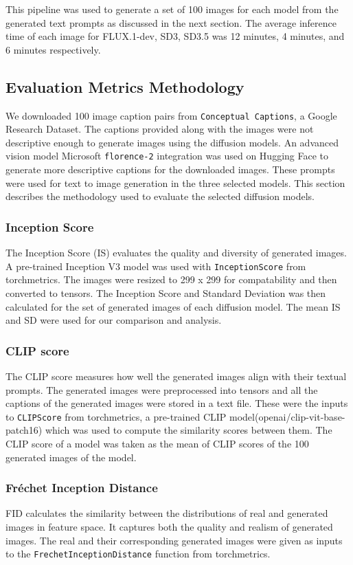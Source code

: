 \documentclass{article}
\begin{document}
This pipeline was used to generate a set of 100 images for each model from the generated text prompts as discussed in the next section. The average inference time of each image for FLUX.1-dev, SD3, SD3.5 was 12 minutes, 4 minutes, and 6 minutes respectively.

\subsection{Evaluation Metrics Methodology}
We downloaded 100 image caption pairs from \texttt{Conceptual Captions}, a Google Research Dataset. 
The captions provided along with the images were not descriptive enough to generate images 
using the diffusion models. An advanced vision model Microsoft \texttt{florence-2} integration was used on Hugging Face 
to generate more descriptive captions for the downloaded images. These prompts were used for text to image generation 
in the three selected models. This section describes the methodology used to evaluate the selected diffusion models. 

\subsubsection{Inception Score}
The Inception Score (IS) evaluates the quality and diversity of generated images. A pre-trained Inception V3 model was used with 
\texttt{InceptionScore} from torchmetrics. The images were resized to 299 x 299 for compatability and then converted to tensors. The Inception Score
and Standard Deviation was then calculated for the set of generated images of each diffusion model. The mean IS and SD were used for our comparison and analysis.

\subsubsection{CLIP score}
The CLIP score measures how well the generated images align with their textual prompts. The generated images were 
preprocessed into tensors and all the captions of the generated images were stored in a text file. These were the inputs to \texttt{CLIPScore} from 
torchmetrics, a pre-trained CLIP model(openai/clip-vit-base-patch16) which was 
used to compute the similarity scores between them. The CLIP score of a model was taken as the mean of CLIP scores 
of the 100 generated images of the model. 

\subsubsection{Fréchet Inception Distance}
FID calculates the similarity between the distributions of real and generated images 
in feature space. It captures both the quality and realism of generated images. The real and their corresponding generated images 
were given as inputs to the \texttt{FrechetInceptionDistance} function from torchmetrics.
\end{document}
